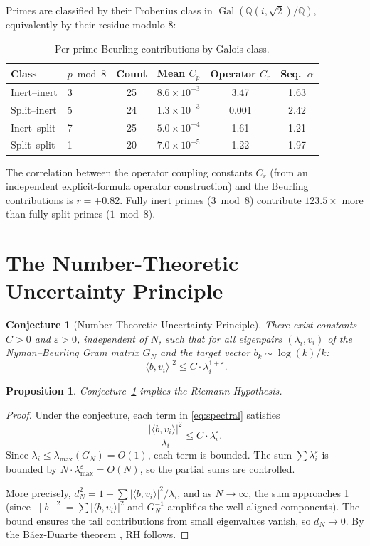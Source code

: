 \documentclass[11pt,a4paper]{article}
\newtheorem{conjecture}{Conjecture}
\newtheorem{proposition}{Proposition}
\begin{document}
Primes are classified by their Frobenius class in $\operatorname{Gal}(\mathbb{Q}(i, \sqrt{2})/\mathbb{Q})$, equivalently by their residue modulo 8:

\begin{table}[h]
\centering
\caption{Per-prime Beurling contributions by Galois class.}
\label{tab:galois}
\begin{tabular}{@{}llcccc@{}}
\toprule
Class & $p \bmod 8$ & Count & Mean $C_p$ & Operator $C_r$ & Seq.\ $\alpha$ \\
\midrule
Inert--inert & 3 & 25 & $8.6 \times 10^{-3}$ & 3.47 & 1.63 \\
Split--inert & 5 & 24 & $1.3 \times 10^{-3}$ & 0.001 & 2.42 \\
Inert--split & 7 & 25 & $5.0 \times 10^{-4}$ & 1.61 & 1.21 \\
Split--split & 1 & 20 & $7.0 \times 10^{-5}$ & 1.22 & 1.97 \\
\bottomrule
\end{tabular}
\end{table}

The correlation between the operator coupling constants $C_r$ (from an independent explicit-formula operator construction) and the Beurling contributions is $r = +0.82$. Fully inert primes ($3 \bmod 8$) contribute $123.5\times$ more than fully split primes ($1 \bmod 8$).

\section{The Number-Theoretic Uncertainty Principle}

\begin{conjecture}[Number-Theoretic Uncertainty Principle]\label{conj:ntup}
There exist constants $C > 0$ and $\varepsilon > 0$, independent of $N$, such that for all eigenpairs $(\lambda_i, v_i)$ of the Nyman--Beurling Gram matrix $G_N$ and the target vector $b_k \sim \log(k)/k$:
\[
|\langle b, v_i \rangle|^2 \leq C \cdot \lambda_i^{1 + \varepsilon}.
\]
\end{conjecture}

\begin{proposition}
Conjecture~\ref{conj:ntup} implies the Riemann Hypothesis.
\end{proposition}

\begin{proof}
Under the conjecture, each term in \eqref{eq:spectral} satisfies
\[
\frac{|\langle b, v_i \rangle|^2}{\lambda_i} \leq C \cdot \lambda_i^{\varepsilon}.
\]
Since $\lambda_i \leq \lambda_{\max}(G_N) = O(1)$, each term is bounded. The sum $\sum \lambda_i^{\varepsilon}$ is bounded by $N \cdot \lambda_{\max}^{\varepsilon} = O(N)$, so the partial sums are controlled.

More precisely, $d_N^2 = 1 - \sum |\langle b, v_i \rangle|^2 / \lambda_i$, and as $N \to \infty$, the sum approaches 1 (since $\|b\|^2 = \sum |\langle b, v_i \rangle|^2$ and $G_N^{-1}$ amplifies the well-aligned components). The bound ensures the tail contributions from small eigenvalues vanish, so $d_N \to 0$. By the B\'aez-Duarte theorem \cite{baez2003}, RH follows.
\end{proof}
\end{document}
